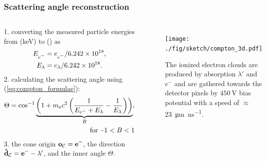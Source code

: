 \documentclass[aspectratio=169]{beamer}
\newcommand{\minus}{\scalebox{0.75}[1.0]{$-$}}
\begin{document}
\begin{frame}
\frametitle{Scattering angle reconstruction}

  \begin{columns}[c]


  1. converting the measured particle energies from (\si{\kilo\electronvolt}) to (\si{\joul}) as
  \begin{align*}
    E_{e^{\minus}} &= e_{e^{\minus}}/6.242\times10^{18},\\
    E_{\lambda} &= e_{\lambda}/6.242\times10^{18}.
  \end{align*}
  2. calculating the scattering angle using (\ref{eq:compton_formulae}):
  \begin{align*}
    \Theta = \cos^{-1} \underbrace{\left(1 + m_e c^2 \left(\frac{1}{E_{e^{-}} + E_\lambda} - \frac{1}{E_\lambda}\right)\right)}_{B},\\\text{for}\ \minus 1 < B < 1
  \end{align*}
  3. the cone origin $\mathbf{o}_{\mathcal{C}} = \mathbf{e}^{\minus}$, the direction $\mathbf{\hat{d}}_\mathcal{C} = \mathbf{e}^{\minus} - \lambda'$, and the inner angle $\Theta$.



  \begin{figure}
    \centering
    \texttt{[image: ./fig/sketch/compton\_3d.pdf]}
    \caption{
      The ionized electron clouds are produced by absorption $\lambda'$ and $e^-$ and are gathered towards the detector pixels by $\SI{450}{\volt}$ bias potential with a speed of $\approx$\,\SI{23}{\micro\meter\per\nano\second}.
    }
  \end{figure}


  \end{columns}

\end{frame}

\end{document}
